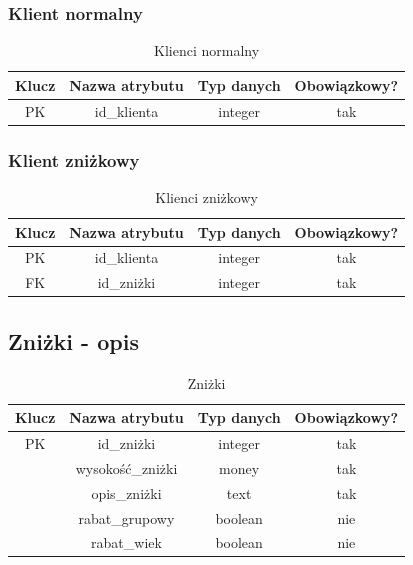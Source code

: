 \documentclass{sprawozdanie-agh}
\begin{document}
\subsubsection{Klient normalny}
\begin{table}[H]
	\centering
	\begin{tabular}{|c|c|c|c|}
		\hline
		Klucz & Nazwa atrybutu & Typ danych & Obowiązkowy? \\ \hline
		PK    & id\_klienta    & integer    & tak           \\ \hline
	\end{tabular}
	\caption{Klienci normalny}
\end{table}

\subsubsection{Klient zniżkowy}
\begin{table}[H]
	\centering
	\begin{tabular}{|c|c|c|c|}
		\hline
		Klucz & Nazwa atrybutu & Typ danych & Obowiązkowy? \\ \hline
		PK    & id\_klienta    & integer    & tak           \\ \hline
		FK    & id\_zniżki    & integer    & tak           \\ \hline
	\end{tabular}
	\caption{Klienci zniżkowy}
\end{table}

\subsection{Zniżki - opis}
\begin{table}[H]
	\centering
	\begin{tabular}{|c|c|c|c|}
		\hline
		Klucz & Nazwa atrybutu      & Typ danych & Obowiązkowy? \\ \hline
		PK    & id\_zniżki         & integer    & tak           \\ \hline
		      & wysokość\_zniżki & money      & tak           \\ \hline
		      & opis\_zniżki       & text       & tak           \\ \hline
		      & rabat\_grupowy      & boolean    & nie           \\ \hline
		      & rabat\_wiek         & boolean    & nie           \\ \hline
	\end{tabular}
	\caption{Zniżki}
\end{table}
\end{document}
